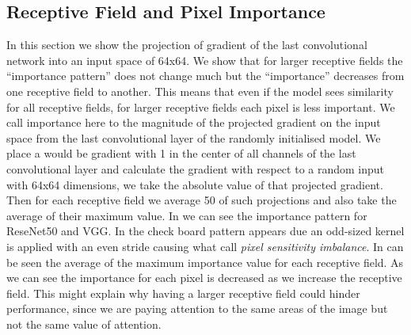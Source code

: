 \subsection{Receptive Field and Pixel Importance}\label{subsec:Receptive_field_and_pixel_importance}
In this section we show the projection of gradient of the last convolutional network into an input space of 64x64. We
show that for larger receptive fields the ``importance pattern'' does not change much but the ``importance'' decreases
from one receptive field to another. This means that even if the model sees similarity for all receptive fields, for
larger receptive fields each pixel is less important. We call importance here to the magnitude of the projected
gradient on the input space from the last convolutional layer of the  randomly initialised model. We place a would be gradient with 1 in the center of all channels
of the last convolutional layer and calculate the gradient with respect to a random input with 64x64 dimensions, we take
the absolute value of that projected gradient. Then for each receptive field we average 50 of such projections and also
take the average of their maximum value. In  we can see the importance pattern for ReseNet50 and
VGG. In  the check board pattern appears due an odd-sized kernel is applied with an
even stride causing what \cite{kimDeadPixelTest2023} call \textit{pixel sensitivity imbalance}.
In  can be seen the average of the maximum importance value for each receptive
field. As we can see the importance for each pixel is decreased as we increase the receptive field. This might explain
why having a larger receptive field could hinder performance, since we are paying attention to the same areas of the
image but not the same value of attention.

